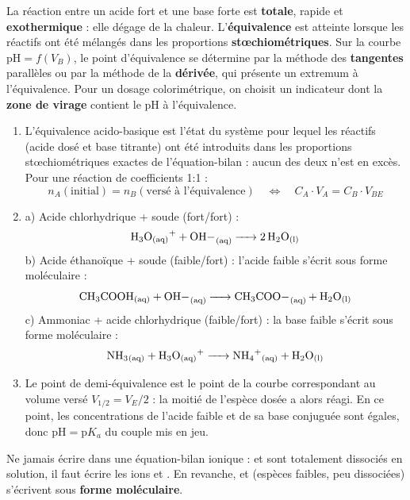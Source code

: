 \documentclass[11pt]{article}
\newcommand{\cle}[1]{{\popxbold\color{popdark}#1}}
\begin{document}
\begin{corrige}
La réaction entre un acide fort et une base forte est \textbf{totale}, rapide et \textbf{exothermique} : elle dégage de la chaleur. L'\textbf{équivalence} est atteinte lorsque les réactifs ont été mélangés dans les proportions \textbf{stœchiométriques}. Sur la courbe $\mathrm{pH} = f(V_B)$, le point d'équivalence se détermine par la méthode des \textbf{tangentes} parallèles ou par la méthode de la \textbf{dérivée}, qui présente un extremum à l'équivalence. Pour un dosage colorimétrique, on choisit un indicateur dont la \textbf{zone de virage} contient le pH à l'équivalence.
\end{corrige}

\begin{corrige}
\begin{enumerate}
\item L'\cle{équivalence acido-basique} est l'état du système pour lequel les réactifs (acide dosé et base titrante) ont été introduits dans les proportions stœchiométriques exactes de l'équation-bilan : aucun des deux n'est en excès. Pour une réaction de coefficients 1:1 :
\[ n_A(\text{initial}) = n_B(\text{versé à l'équivalence}) \quad \Longleftrightarrow \quad C_A \cdot V_A = C_B \cdot V_{BE} \]
\item a) Acide chlorhydrique + soude (fort/fort) :
\[ \ce{H3O+_{(aq)} + OH-_{(aq)} -> 2H2O_{(l)}} \]
b) Acide éthanoïque + soude (faible/fort) : l'acide faible s'écrit sous forme moléculaire :
\[ \ce{CH3COOH_{(aq)} + OH-_{(aq)} -> CH3COO-_{(aq)} + H2O_{(l)}} \]
c) Ammoniac + acide chlorhydrique (faible/fort) : la base faible s'écrit sous forme moléculaire :
\[ \ce{NH3_{(aq)} + H3O+_{(aq)} -> NH4+_{(aq)} + H2O_{(l)}} \]
\item Le \cle{point de demi-équivalence} est le point de la courbe correspondant au volume versé $V_{1/2} = V_E/2$ : la moitié de l'espèce dosée a alors réagi. En ce point, les concentrations de l'acide faible et de sa base conjuguée sont égales, donc $\mathrm{pH} = \mathrm{p}K_a$ du couple mis en jeu.
\end{enumerate}
\end{corrige}

\begin{attention}
Ne jamais écrire  dans une équation-bilan ionique :  et  sont totalement dissociés en solution, il faut écrire les ions  et . En revanche,  et  (espèces faibles, peu dissociées) s'écrivent sous \textbf{forme moléculaire}.
\end{attention}
\end{document}
